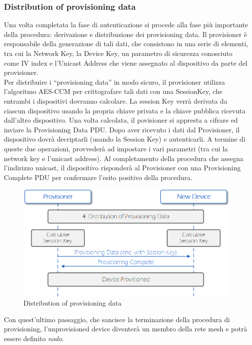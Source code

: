 \subsubsection{Distribution of provisioning data}
Una volta completata la fase di autenticazione si procede alla fase più importante della procedura: derivazione e distribuzione dei provisioning data. Il provisioner è responsabile della generazione di tali dati, che consistono in una serie di elementi, tra cui la Network Key, la Device Key, un parametro di sicurezza conosciuto come IV index e l'Unicast Address che viene assegnato al dispositivo da parte del provisioner.\\
Per distribuire i ``provisioning data'' in modo sicuro, il provisioner utilizza l'algoritmo AES-CCM per crittografare tali dati con una SessionKey, che entrambi i dispositivi dovranno calcolare. La session Key verrà derivata da ciascun dispositivo usando la propria chiave privata e la chiave pubblica ricevuta dall'altro dispositivo. Una volta calcolata, il povisioner si appresta a cifrare ed inviare la Provisioning Data PDU. 
Dopo aver ricevuto i dati dal Provisioner, il dispositivo dovrà decriptarli (usando la Session Key) e autenticarli. A termine di queste due operazioni, provvederà ad impostare i vari parametri (tra cui la network key e l'unicast address). Al completamento della procedura che assegna l'indirizzo unicast, il dispositivo risponderà al Provisioner con una  Provisioning Complete PDU per confermare l'esito positivo della procedura.

\begin{figure}[!ht]
    \centering
    \includegraphics[width = \textwidth]{images/Provisioning_distribution_data.png}
    \caption{Distribution of provisioning data}
    \label{fig:provisioning_distribution_data}
\end{figure}

Con quest'ultimo passaggio, che sancisce la terminazione della procedura di provisioning, l'unprovisioned device diventerà un membro della rete mesh e potrà essere definito \textit{nodo}.

